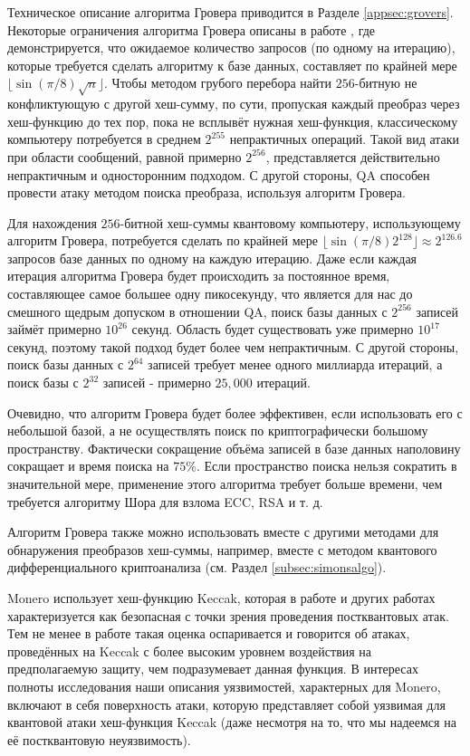 \documentclass{mrl}
\begin{document}
Техническое описание алгоритма Гровера приводится в Разделе \ref{appsec:grovers}. Некоторые ограничения алгоритма Гровера описаны в работе \cite{boyer1998tight}, где демонстрируется, что ожидаемое количество запросов (по одному на итерацию), которые требуется сделать алгоритму к базе данных, составляет по крайней мере $\lfloor \sin(\pi/8) \sqrt{n}\rfloor$. Чтобы методом грубого перебора найти $256$-битную не конфликтующую с другой хеш-сумму, по сути, пропуская каждый преобраз через хеш-функцию до тех пор, пока не всплывёт нужная хеш-функция, классическому компьютеру потребуется в среднем $2^{255}$ непрактичных операций. Такой вид атаки при области сообщений, равной примерно $2^{256}$, представляется действительно непрактичным и односторонним подходом. С другой стороны, QA способен провести атаку методом поиска преобраза, используя алгоритм Гровера.

Для нахождения $256$-битной хеш-суммы квантовому компьютеру, использующему алгоритм Гровера, потребуется сделать по крайней мере $\lfloor \sin(\pi/8) 2^{128}\rfloor \approx 2^{126.6}$ запросов базе данных по одному на каждую итерацию. Даже если каждая итерация алгоритма Гровера будет происходить за постоянное время, составляющее самое большее одну пикосекунду, что является для нас до смешного щедрым допуском в отношении QA, поиск базы данных с $2^{256}$ записей займёт примерно $10^{26}$ секунд. Область будет существовать уже примерно $10^{17}$ секунд, поэтому такой подход будет более чем непрактичным. С другой стороны, поиск базы данных с $2^{64}$ записей требует менее одного миллиарда итераций, а поиск базы с $2^{32}$ записей - примерно $25,000$ итераций. 

Очевидно, что алгоритм Гровера будет более эффективен, если использовать его с небольшой базой, а не осуществлять поиск по криптографически большому пространству. Фактически сокращение объёма записей в базе данных наполовину сокращает и время поиска на $75\%$. Если пространство поиска нельзя сократить в значительной мере, применение этого алгоритма требует больше времени, чем требуется алгоритму Шора для взлома ECC, RSA и т. д.

Алгоритм Гровера также можно использовать вместе с другими методами для обнаружения преобразов хеш-суммы, например, вместе с методом квантового дифференциального криптоанализа (см. Раздел \ref{subsec:simonsalgo}).

Monero использует хеш-функцию Keccak, которая в работе \cite{czajkowski2017quantum} и других работах характеризуется как безопасная с точки зрения проведения постквантовых атак. Тем не менее в работе \cite{bernsteinwhitepaper} такая оценка оспаривается и говорится об атаках, проведённых на Keccak с более высоким уровнем воздействия на предполагаемую защиту, чем подразумевает данная функция. В интересах полноты исследования наши описания уязвимостей, характерных для Monero, включают в себя поверхность атаки, которую представляет собой уязвимая для квантовой атаки хеш-функция Keccak (даже несмотря на то, что мы надеемся на её постквантовую неуязвимость).
\end{document}
